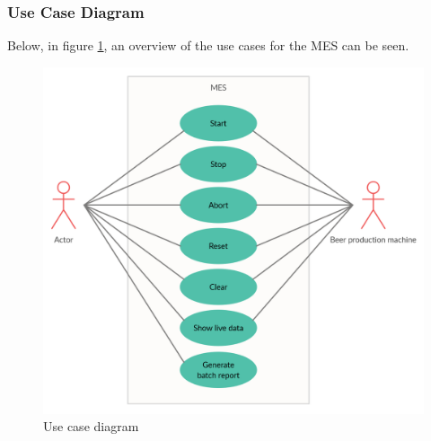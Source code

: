 
\subsubsection{Use Case Diagram}
Below, in figure \ref{figure:ucdiagram}, an overview of the use cases for the
MES can be seen.

\begin{figure}[ht]
	\centering 
	\includegraphics[scale=0.3]{images/ucdiagram.png}
	\caption{Use case diagram}
	\label{figure:ucdiagram} 
\end{figure}